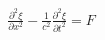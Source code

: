 \documentclass[preview]{standalone}
\begin{document}
\begin{align*}
\frac{\partial^2 \xi}{\partial x^2} - \frac{1}{c^2}\frac{\partial^2 \xi}{\partial t^2}  = F
\end{align*}
\end{document}
